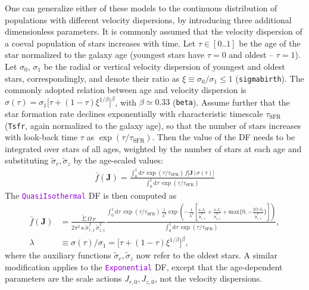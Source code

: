 \documentclass[12pt]{article}
\newcommand{\ttt}[1]{\textcolor{darkviolet}{\texttt{#1}}}
\newcommand{\ppp}[1]{\textcolor{darkolive} {\texttt{#1}}}
\newcommand{\D}{\mathrm{d}}
\newcommand{\bJ}{\boldsymbol{J}}
\begin{document}
One can generalize either of these models to the continuous distribution of populations with different velocity dispersions, by introducing three additional dimensionless parameters. It is commonly assumed that the velocity dispersion of a coeval population of stars increases with time. Let $\tau\in[0..1]$ be the age of the star normalized to the galaxy age (youngest stars have $\tau=0$ and oldest -- $\tau=1$). Let $\sigma_0$, $\sigma_1$ be the radial or vertical velocity dispersion of youngest and oldest stars, correspondingly, and denote their ratio as $\xi\equiv \sigma_0/\sigma_1 \le 1$ (\ppp{sigmabirth}). The commonly adopted relation between age and velocity dispersion \cite{AumerBinney2009} is $\sigma(\tau) = \sigma_1 \big[\tau + (1-\tau)\xi^{1/\beta} \big]^\beta$, with $\beta\simeq 0.33$ (\ppp{beta}). Assume further that the star formation rate declines exponentially with characteristic timescale $\tau_\mathrm{SFR}$ (\ppp{Tsfr}, again normalized to the galaxy age), so that the number of stars increases with look-back time $\tau$ as $\exp(\tau/\tau_\mathrm{SFR})$. Then the value of the DF needs to be integrated over stars of all ages, weighted by the number of stars at each age and substituting $\tilde\sigma_r, \tilde\sigma_z$ by the age-scaled values:
\begin{align*}
\bar f(\bJ) = \frac{\int_0^1 \D\tau\, \exp(\tau/\tau_\mathrm{SFR})\,
f\big[ \bJ \,|\, \sigma(\tau) \big] }{\int_0^1 \D\tau\, \exp(\tau/\tau_\mathrm{SFR})}
\end{align*}
The \ttt{QuasiIsothermal} DF is then computed as
\begin{align*}
\bar f(\bJ) &= \frac{\tilde\Sigma\,\Omega\,\nu}
{2\pi^2\,\kappa\,\tilde\sigma_{r,1}^2\,\tilde\sigma_{z,1}^2}
\frac{ \displaystyle \int_0^1 \D\tau\, \exp(\tau/\tau_\mathrm{SFR})\,
\frac{1}{\lambda^4} \exp\left(-\frac{1}{\lambda^2}
\left[ \frac{\kappa\,J_r}{\tilde\sigma_{r,1}^2} + \frac{\nu\,J_z}{\tilde\sigma_{z,1}^2} +
\mathrm{max}\bigg\{0, -\frac{2\Omega\,J_\phi}{\tilde\sigma_{r,1}^2}\bigg\} \right]\right)}
{ \int_0^1 \D\tau\, \exp(\tau/\tau_\mathrm{SFR}) } ,\\
\lambda &\equiv \sigma(\tau)/\sigma_1 = \big[\tau + (1-\tau)\xi^{1/\beta}\big]^\beta ,
\end{align*}
where the auxiliary functions $\tilde\sigma_r,\tilde\sigma_z$ now refer to the oldest stars. A similar modification applies to the \ttt{Exponential} DF, except that the age-dependent parameters are the scale actions $J_{r,0}, J_{z,0}$, not the velocity dispersions.

\end{document}
